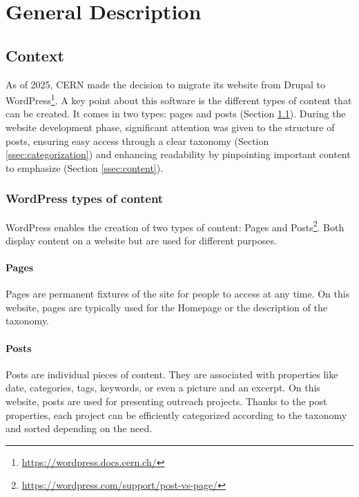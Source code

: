 \part{General Description}\label{part:general}

\chapter{Context}\label{chap:context}

As of 2025, CERN made the decision to migrate its website from Drupal to WordPress\footnote{\href{https://wordpress.docs.cern.ch/}{https://wordpress.docs.cern.ch/}}. A key point about this software is the different types of content that can be created. It comes in two types: pages and posts (Section \ref{ssec:typecontent}). During the website development phase, significant attention was given to the structure of posts, ensuring easy access through a clear taxonomy (Section \ref{ssec:categorization}) and enhancing readability by pinpointing important content to emphasize (Section \ref{ssec:content}).

\section{WordPress types of content}\label{ssec:typecontent}

WordPress enables the creation of two types of content: Pages and Posts\footnote{\href{https://wordpress.com/support/post-vs-page/}{https://wordpress.com/support/post-vs-page/}}. Both display content on a website but are used for different purposes. 

\subsection*{Pages}
Pages are permanent fixtures of the site for people to access at any time. On this website, pages are typically used for the Homepage or the description of the taxonomy.

\subsection*{Posts}
Posts are individual pieces of content. They are associated with properties like date, categories, tags, keywords, or even a picture and an excerpt. On this website, posts are used for presenting outreach projects. Thanks to the post properties, each project can be efficiently categorized according to the taxonomy and sorted depending on the need.

